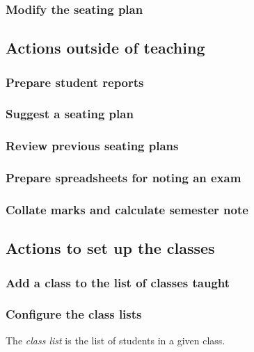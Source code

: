 \documentclass[10pt]{article}
\begin{document}
\subsubsection{Modify the seating plan}
 
 
 
 
\subsection{Actions outside of teaching}
 
\subsubsection{Prepare student reports}

\subsubsection{Suggest a seating plan}

\subsubsection{Review previous seating plans}

\subsubsection{Prepare spreadsheets for noting an exam}

\subsubsection{Collate marks and calculate semester note}





\subsection{Actions to set up the classes}
 
\subsubsection{Add a class to the list of classes taught}

\subsubsection{Configure the class lists}
The \emph{class list} is the list of students in a given class.
\end{document}
